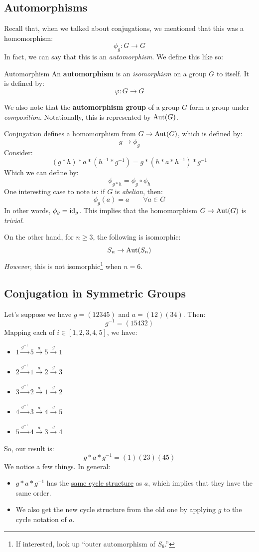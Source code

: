 \documentclass[letterpaper]{article}
\begin{document}
\subsection{Automorphisms}
Recall that, when we talked about conjugations, we mentioned that this was a homomorphism: 
\[\phi_g: G \to G\]
In fact, we can say that this is an \emph{automorphism}. We define this like so: 
\begin{definition}{Automorphism}{}
    An \textbf{automorphism} is an \emph{isomorphism} on a group $G$ to itself. It is defined by: 
    \[\varphi: G \to G\]
\end{definition}
We also note that the \textbf{automorphism group} of a group $G$ form a group under \emph{composition}. Notationally, this is represented by $\operatorname{Aut}(G)$.

\bigskip 

Conjugation defines a homomorphism from $G \to \operatorname{Aut}(G)$, which is defined by: 
\[g \to \phi_g\]
Consider:
\[(g * h) * a * (h^{-1} * g^{-1}) = g * (h * a * h^{-1}) * g^{-1}\]
Which we can define by: 
\[\phi_{g * h} = \phi_g \circ \phi_h\]
One interesting case to note is: if $G$ is \emph{abelian}, then: 
\[\phi_g (a) = a \qquad \forall a \in G\]
In other words, $\phi_g = \operatorname{id}_g$. This implies that the homomorphism $G \to \operatorname{Aut}(G)$ is \emph{trivial}.

\bigskip 

On the other hand, for $n \geq 3$, the following is isomorphic:  
\[S_n \to \operatorname{Aut}(S_n)\]
\emph{However}, this is not isomorphic\footnote{If interested, look up ``outer automorphism of $S_6$.''} when $n = 6$. 

\subsection{Conjugation in Symmetric Groups}
Let's suppose we have $g = (12345)$ and $a = (12)(34)$. Then: 
\[g^{-1} = (15432)\]
Mapping each of $i \in [1, 2, 3, 4, 5]$, we have: 
\begin{itemize}
    \item $1 \xrightarrow{g^{-1}} 5 \xrightarrow{a} 5 \xrightarrow{g} 1$
    \item $2 \xrightarrow{g^{-1}} 1 \xrightarrow{a} 2 \xrightarrow{g} 3$
    \item $3 \xrightarrow{g^{-1}} 2 \xrightarrow{a} 1 \xrightarrow{g} 2$
    \item $4 \xrightarrow{g^{-1}} 3 \xrightarrow{a} 4 \xrightarrow{g} 5$
    \item $5 \xrightarrow{g^{-1}} 4 \xrightarrow{a} 3 \xrightarrow{g} 4$
\end{itemize}
So, our result is: 
\[g * a * g^{-1} = (1)(23)(45)\]
We notice a few things. In general:  
\begin{itemize}
    \item $g * a * g^{-1}$ has the \underline{same cycle structure} as $a$, which implies that they have the same order. 
    \item We also get the new cycle structure from the old one by applying $g$ to the cycle notation of $a$. 
\end{itemize}
\end{document}
